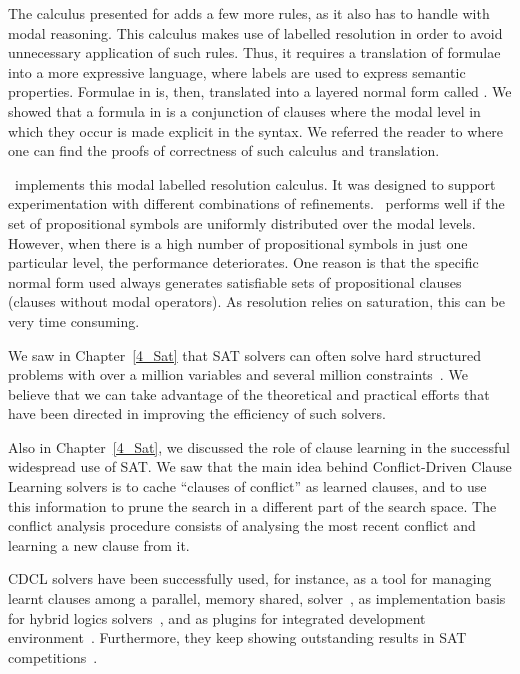The calculus presented for  adds a few more rules, as it also has
to handle with modal reasoning. This calculus makes use of labelled resolution
in order to avoid unnecessary application of such rules. Thus, it requires a
translation of formulae into a more expressive language, where labels are used
to express semantic properties. Formulae in  is, then, translated
into a layered normal form called . We showed that a formula in
 is a conjunction of clauses where the modal level in which they occur
is made explicit in the syntax. We referred the reader to where one can find the
proofs of correctness of such calculus and translation.

\ksp~implements this modal labelled resolution calculus. It was designed to
support experimentation with different combinations of refinements.
\ksp~performs well if the set of propositional symbols are uniformly distributed
over the modal levels. However, when there is a high number of propositional
symbols in just one particular level, the performance deteriorates. One reason
is that the specific normal form used always generates satisfiable sets of
propositional clauses (clauses without modal operators). As resolution relies on
saturation, this can be very time consuming. 

We saw in Chapter~\ref{4_Sat} that SAT solvers can often solve hard structured
problems with over a million variables and several million
constraints~\cite{satchapter}. We believe that we can take advantage of the
theoretical and practical efforts that have been directed in improving the
efficiency of such solvers. 

Also in Chapter~\ref{4_Sat}, we discussed the role of clause learning in the
successful widespread use of SAT\@. We saw that the main idea behind
Conflict-Driven Clause Learning solvers is to cache ``clauses of conflict'' as
learned clauses, and to use this information to prune the search in a different
part of the search space. The conflict analysis procedure consists of analysing
the most recent conflict and learning a new clause from it.

CDCL solvers have been successfully used, for instance, as a tool for managing
learnt clauses among a parallel, memory shared, solver~\cite{audemard2014lazy},
as implementation basis for hybrid logics solvers~\cite{sheini2006pueblo}, and
as plugins for integrated development environment~\cite{le2010sat4j}.
Furthermore, they keep showing outstanding results in SAT
competitions~\cite{audemard2014glucose,biere2016splatz}. 

